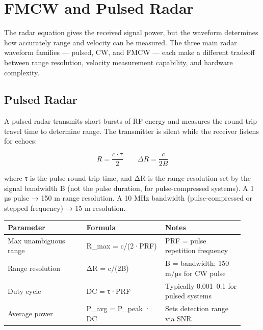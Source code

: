 \section{FMCW and Pulsed Radar}\label{sec:wiki_fmcw_radar}



The radar equation gives the received signal power, but the waveform determines how accurately range and velocity can be measured. The three main radar waveform families — pulsed, CW, and FMCW — each make a different tradeoff between range resolution, velocity measurement capability, and hardware complexity.

      

\subsection{Pulsed Radar}

      

A pulsed radar transmits short bursts of RF energy and measures the round-trip travel time to determine range. The transmitter is silent while the receiver listens for echoes:

      
\[R = \dfrac{c \cdot \tau}{2} \qquad \Delta R = \dfrac{c}{2B}\]

      

where τ is the pulse round-trip time, and ΔR is the range resolution set by the signal bandwidth B (not the pulse duration, for pulse-compressed systems). A 1 µs pulse → 150 m range resolution. A 10 MHz bandwidth (pulse-compressed or stepped frequency) → 15 m resolution.

      
        
        
        
        
        
      

{\small\begin{longtable}{>{\raggedright\arraybackslash}p{0.307\linewidth}>{\raggedright\arraybackslash}p{0.307\linewidth}>{\raggedright\arraybackslash}p{0.307\linewidth}}
\hline
\textbf{Parameter} & \textbf{Formula} & \textbf{Notes} \\
\hline
Max unambiguous range & R\_max = c/(2·PRF) & PRF = pulse repetition frequency \\
Range resolution & ΔR = c/(2B) & B = bandwidth; 150 m/µs for CW pulse \\
Duty cycle & DC = τ·PRF & Typically 0.001–0.1 for pulsed systems \\
Average power & P\_avg = P\_peak · DC & Sets detection range via SNR \\
\hline
\end{longtable}}

